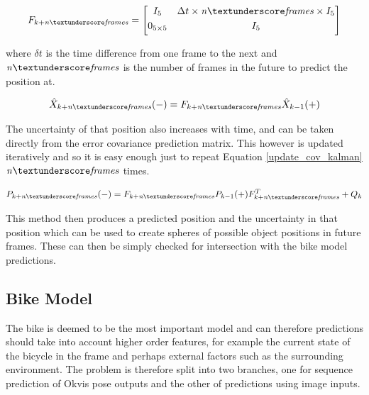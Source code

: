\documentclass[11pt,twoside]{report}
\begin{document}
\begin{equation}
F_{k+\mathit{n \textunderscore frames}} = 
\begin{bmatrix}
I_{5} & \Delta t \times \mathit{n \textunderscore frames} \times I_{5} \\[0.3em]

0_{5 \times 5} & I_{5} \\[0.3em]
\end{bmatrix}
\end{equation}

where $\delta t$ is the time difference from one frame to the next and $\mathit{n \textunderscore frames}$ is the number of frames in the future to predict the position at.

\begin{equation}
\begin{aligned}
\hat{X}_{k+\mathit{n \textunderscore frames}}(-) =  F_{k+\mathit{n \textunderscore frames}} \hat{X}_{k-1}(+)
\end{aligned}
\end{equation}

The uncertainty of that position also increases with time, and can be taken directly from the error covariance prediction matrix. This however is updated iteratively and so it is easy enough just to repeat Equation \ref{update_cov_kalman} $\mathit{n \textunderscore frames}$ times.

\begin{equation}
\begin{aligned}
P_{k+\mathit{n \textunderscore frames}}(-) = F_{k+\mathit{n \textunderscore frames}} P_{k-1}(+) F_{k+\mathit{n \textunderscore frames}}^{T} + Q_{k}
\end{aligned}
\label{update_cov_kalman}
\end{equation}

This method then produces a predicted position and the uncertainty in that position which can be used to create spheres of possible object positions in future frames. These can then be simply checked for intersection with the bike model predictions.

\subsection{Bike Model}

The bike is deemed to be the most important model and can therefore predictions should take into account higher order features, for example the current state of the bicycle in the frame and perhaps external factors such as the surrounding environment. The problem is therefore split into two branches, one for sequence prediction of Okvis pose outputs and the other of predictions using image inputs.
\end{document}
